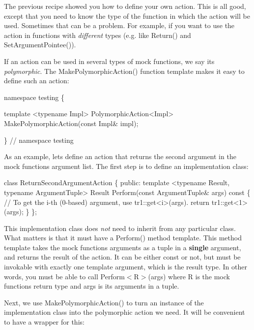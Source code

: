The previous recipe showed you how to define your own action. This is all good, except that you need to know the type of the function in which the action will be used. Sometimes that can be a problem. For example, if you want to use the action in functions with {\itshape different} types (e.\+g. like {\ttfamily Return()} and {\ttfamily Set\+Argument\+Pointee()}).

If an action can be used in several types of mock functions, we say it\textquotesingle{}s {\itshape polymorphic}. The {\ttfamily Make\+Polymorphic\+Action()} function template makes it easy to define such an action\+:


\begin{DoxyCode}
namespace testing \{

template <typename Impl>
PolymorphicAction<Impl> MakePolymorphicAction(const Impl& impl);

\}  // namespace testing
\end{DoxyCode}


As an example, let\textquotesingle{}s define an action that returns the second argument in the mock function\textquotesingle{}s argument list. The first step is to define an implementation class\+:


\begin{DoxyCode}
class ReturnSecondArgumentAction \{
 public:
  template <typename Result, typename ArgumentTuple>
  Result Perform(const ArgumentTuple& args) const \{
    // To get the i-th (0-based) argument, use tr1::get<i>(args).
    return tr1::get<1>(args);
  \}
\};
\end{DoxyCode}


This implementation class does {\itshape not} need to inherit from any particular class. What matters is that it must have a {\ttfamily Perform()} method template. This method template takes the mock function\textquotesingle{}s arguments as a tuple in a {\bfseries single} argument, and returns the result of the action. It can be either {\ttfamily const} or not, but must be invokable with exactly one template argument, which is the result type. In other words, you must be able to call {\ttfamily Perform$<$R$>$(args)} where {\ttfamily R} is the mock function\textquotesingle{}s return type and {\ttfamily args} is its arguments in a tuple.

Next, we use {\ttfamily Make\+Polymorphic\+Action()} to turn an instance of the implementation class into the polymorphic action we need. It will be convenient to have a wrapper for this\+:


